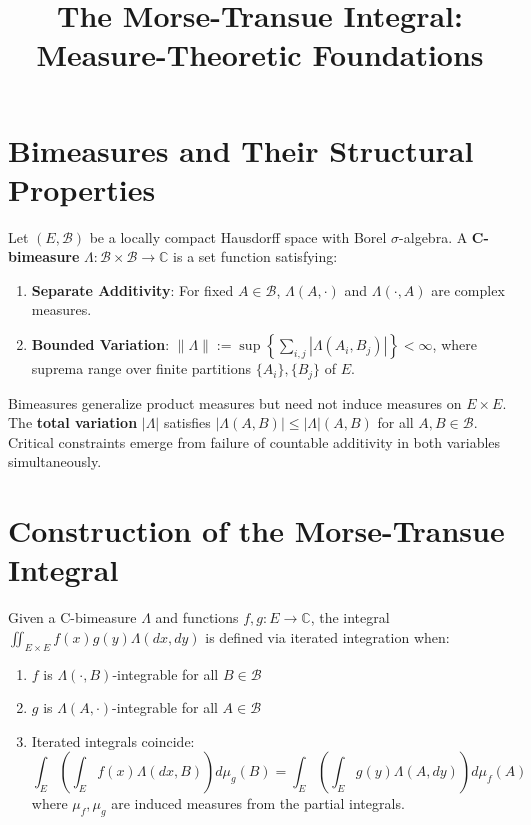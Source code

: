 \documentclass{article}
\title{The Morse-Transue Integral: Measure-Theoretic Foundations}
\author{}
\date{}
\begin{document}
\maketitle

\section{Bimeasures and Their Structural Properties}
Let $(E, \mathcal{B})$ be a locally compact Hausdorff space with Borel $\sigma$-algebra. A \textbf{C-bimeasure} $\Lambda: \mathcal{B} \times \mathcal{B} \to \mathbb{C}$ is a set function satisfying:
\begin{enumerate}
\item \textbf{Separate Additivity}: For fixed $A \in \mathcal{B}$, $\Lambda(A, \cdot)$ and $\Lambda(\cdot, A)$ are complex measures.
\item \textbf{Bounded Variation}: $\|\Lambda\| := \sup \left\{ \sum_{i,j} |\Lambda(A_i, B_j)| \right\} < \infty$, where suprema range over finite partitions $\{A_i\}, \{B_j\}$ of $E$.
\end{enumerate}

Bimeasures generalize product measures but need not induce measures on $E \times E$. The \textbf{total variation} $|\Lambda|$ satisfies $|\Lambda(A,B)| \leq |\Lambda|(A,B)$ for all $A,B \in \mathcal{B}$. Critical constraints emerge from failure of countable additivity in both variables simultaneously.

\section{Construction of the Morse-Transue Integral}
Given a C-bimeasure $\Lambda$ and functions $f, g: E \to \mathbb{C}$, the integral $\iint_{E \times E} f(x)g(y) \Lambda(dx, dy)$ is defined via iterated integration when:
\begin{enumerate}
\item $f$ is $\Lambda(\cdot, B)$-integrable for all $B \in \mathcal{B}$
\item $g$ is $\Lambda(A, \cdot)$-integrable for all $A \in \mathcal{B}$
\item Iterated integrals coincide:
$$
\int_E \left( \int_E f(x) \Lambda(dx, B) \right) d\mu_g(B) = \int_E \left( \int_E g(y) \Lambda(A, dy) \right) d\mu_f(A)
$$
where $\mu_f, \mu_g$ are induced measures from the partial integrals.
\end{enumerate}
\end{document}
